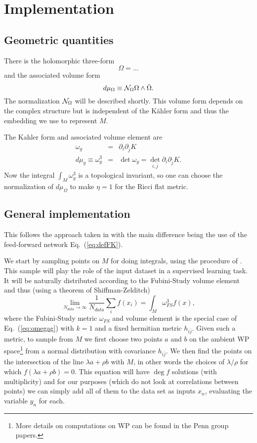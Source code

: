 \documentclass[12pt]{article}
\def\CN {{\cal N}}
\newcommand{\eq}[1]{Eq.~(\ref{eq:#1})}
\newcommand{\be}{\begin{equation}}
\newcommand{\ee}{\end{equation}}
\newcommand{\bea}{\begin{eqnarray}}
\newcommand{\eea}{\end{eqnarray}}
\def\bj{{\bar{j}}}
\begin{document}
\section{ Implementation }


\subsection{ Geometric quantities } 

There is the holomorphic three-form
\be
\Omega = \ldots 
\ee
and the associated volume form
\be
d\mu_\Omega \equiv \CN_\Omega \Omega \wedge \bar\Omega .
\ee
The normalization $\CN_\Omega$ will be described shortly.  
This volume form depends on the complex structure but is independent of the K\"ahler form
and thus the embedding we use to represent $M$.

The Kahler form and associated volume element are
\bea \label{eq:omegag}
\omega_g &=& \partial_i \partial_\bj K \\
\label{eq:MA}
d\mu_g \equiv \omega_g^3 &=& \det \omega_g = \det_{i,\bj} \partial_i \partial_\bj K .
\eea
Now the integral $\int_M\omega_g^3$ is a topological invariant, so one can choose the normalization
of $d\mu_\Omega$ to make $\eta=1$ for the Ricci flat metric.  

\subsection{ General implementation }

This follows the approach taken in \cite{}
with the main difference being the use of the feed-forward network \eq{defFK}.

We start by sampling points on $M$ for doing integrals, using the procedure of \cite{Douglas}.
This sample will play the role of the input dataset in a supervised learning task.
It will be naturally distributed according to the Fubini-Study volume element and thus (using a theorem
of Shiffman-Zelditch)
\be
\lim_{N_{data}\rightarrow\infty} \frac{1}{N_{data}} \sum_i f(x_i) = \int_M \omega_{FS}^3 f(x) ,
\ee
where the Fubini-Study metric $\omega_{FS}$ and volume element is the special case of \eq{omegag} with $k=1$
and a fixed hermitian metric $h_{i\bj}$.  Given such a metric, to sample from $M$ we first choose two points
$a$ and $b$ on the ambient WP space\footnote{ 
More details on computations on WP can be found
in the Penn group papers.} 
from a normal distribution with covariance $h_{i\bj}$.
We then find the points on the intersection of the line $\lambda a+\rho b$ with $M$, in other words
the choices of $\lambda/\rho$ for which $f(\lambda a+\rho b)=0$.  This equation will have $\deg f$
solutions (with multiplicity) and for our purposes (which do not look at correlations between points) we
can simply add all of them to the data set as inputs $x_n$, evaluating the variable $y_n$ for each.
\end{document}

